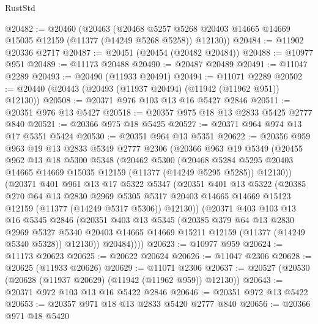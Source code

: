 \begin{lexlean}{RustStd}
\begin{coremodule}
@20482 := @20460
    (@20463
      (@20468 @5257 @5268 @20403 @14665 @14669 @15035 @12159 (@11377 (@14249 @5268 @5258)) @12130))
@20484 := @11902 @20336 @2717
@20487 := @20451 (@20454 (@20482 @20484))
@20488 := @10977 @951
@20489 := @11173 @20488
@20490 := @20487 @20489
@20491 := @11047 @2289
@20493 := @20490 (@11933 @20491)
@20494 := @11071 @2289
@20502 := @20440 (@20443 (@20493 (@11937 @20494) (@11942 (@11962 @951)) @12130))
@20508 := @20371 @976 @103 @13 @16 @5427 @2846
@20511 := @20351 @976 @13 @5427
@20518 := @20357 @975 @18 @13 @2833 @5425 @2777 @840
@20521 := @20366 @975 @18 @5425
@20527 := @20371 @964 @974 @13 @17 @5351 @5424
@20530 := @20351 @964 @13 @5351
@20622 := @20356
    @959
    @963
    @19
    @13
    @2833
    @5349
    @2777
    @2306
    (@20366
      @963
      @19
      @5349
      (@20455
        @962
        @13
        @18
        @5300
        @5348
        (@20462
          @5300
          (@20468
            @5284
            @5295
            @20403
            @14665
            @14669
            @15035
            @12159
            (@11377 (@14249 @5295 @5285))
            @12130))
        (@20371
          @401
          @961
          @13
          @17
          @5322
          @5347
          (@20351
            @401
            @13
            @5322
            (@20385
              @270
              @64
              @13
              @2830
              @2969
              @5305
              @5317
              @20403
              @14665
              @14669
              @15123
              @12159
              (@11377 (@14249 @5317 @5306))
              @12130))
          (@20371
            @403
            @103
            @13
            @16
            @5345
            @2846
            (@20351
              @403
              @13
              @5345
              (@20385
                @379
                @64
                @13
                @2830
                @2969
                @5327
                @5340
                @20403
                @14665
                @14669
                @15211
                @12159
                (@11377 (@14249 @5340 @5328))
                @12130))
            @20484))))
@20623 := @10977 @959
@20624 := @11173 @20623
@20625 := @20622 @20624
@20626 := @11047 @2306
@20628 := @20625 (@11933 @20626)
@20629 := @11071 @2306
@20637 := @20527 (@20530 (@20628 (@11937 @20629) (@11942 (@11962 @959)) @12130))
@20643 := @20371 @972 @103 @13 @16 @5422 @2846
@20646 := @20351 @972 @13 @5422
@20653 := @20357 @971 @18 @13 @2833 @5420 @2777 @840
@20656 := @20366 @971 @18 @5420

\end{coremodule}
\end{lexlean}
